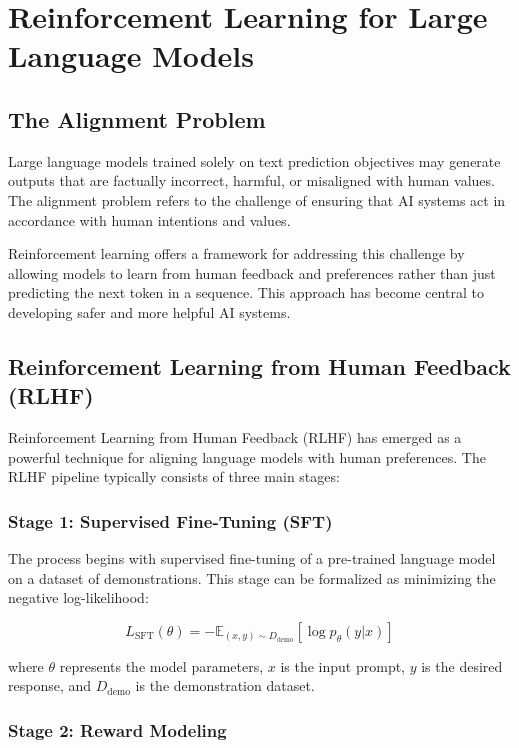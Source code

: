 \documentclass{article}
\begin{document}
\section{Reinforcement Learning for Large Language Models}

\subsection{The Alignment Problem}

Large language models trained solely on text prediction objectives may generate outputs that are factually incorrect, harmful, or misaligned with human values. The alignment problem refers to the challenge of ensuring that AI systems act in accordance with human intentions and values.

Reinforcement learning offers a framework for addressing this challenge by allowing models to learn from human feedback and preferences rather than just predicting the next token in a sequence. This approach has become central to developing safer and more helpful AI systems.

\subsection{Reinforcement Learning from Human Feedback (RLHF)}

Reinforcement Learning from Human Feedback (RLHF) has emerged as a powerful technique for aligning language models with human preferences. The RLHF pipeline typically consists of three main stages:

\subsubsection{Stage 1: Supervised Fine-Tuning (SFT)}

The process begins with supervised fine-tuning of a pre-trained language model on a dataset of demonstrations. This stage can be formalized as minimizing the negative log-likelihood:

\begin{equation}
L_{\text{SFT}}(\theta) = -\mathbb{E}_{(x,y) \sim D_{\text{demo}}}\left[\log p_{\theta}(y|x)\right]
\end{equation}

where $\theta$ represents the model parameters, $x$ is the input prompt, $y$ is the desired response, and $D_{\text{demo}}$ is the demonstration dataset.

\subsubsection{Stage 2: Reward Modeling}
\end{document}
